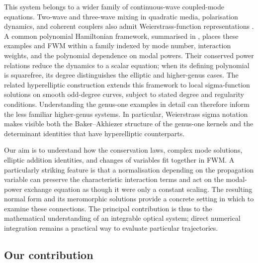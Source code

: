 \documentclass[11pt,a4paper]{article}
\numberwithin{equation}{section}
\begin{document}
This system belongs to a wider family of continuous-wave coupled-mode equations.
Two-wave and three-wave mixing in quadratic media, polarisation dynamics, and coherent couplers also admit Weierstrass-function representations \cite{heskethGeneralComplexEnvelope2015,heskethCompleteWeierstrassElliptic2026}.
A common polynomial Hamiltonian framework, summarised in \cite[Section~4]{heskethGeneratingIntegrableSystems2026}, places these examples and FWM within a family indexed by mode number, interaction weights, and the polynomial dependence on modal powers.
Their conserved power relations reduce the dynamics to a scalar equation; when its defining polynomial is squarefree, its degree distinguishes the elliptic and higher-genus cases.
The related hyperelliptic construction \cite{zotero-item-855} extends this framework to local sigma-function solutions on smooth odd-degree curves, subject to stated degree and regularity conditions.
Understanding the genus-one examples in detail can therefore inform the less familiar higher-genus systems.
In particular, Weierstrass sigma notation makes visible both the Baker--Akhiezer structure of the genus-one kernels and the determinant identities that have hyperelliptic counterparts.

Our aim is to understand how the conservation laws, complex mode solutions, elliptic addition identities, and changes of variables fit together in FWM.
A particularly striking feature is that a normalisation depending on the propagation variable can preserve the characteristic interaction terms and act on the modal-power exchange equation as though it were only a constant scaling.
The resulting normal form and its meromorphic solutions provide a concrete setting in which to examine these connections.
The principal contribution is thus to the mathematical understanding of an integrable optical system; direct numerical integration remains a practical way to evaluate particular trajectories.

\subsection{Our contribution}
\label{subsec:our-contribution}
\end{document}
